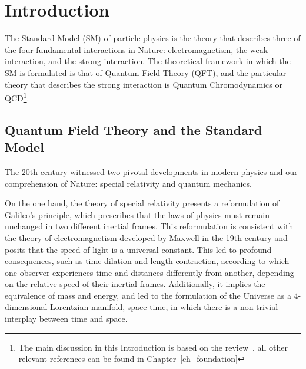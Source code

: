 \chapter*{Introduction}

\label{ch_introduction}



The Standard Model (SM) of particle physics is the theory that describes three of the four fundamental interactions in Nature: electromagnetism, the weak interaction, and the strong interaction. The theoretical framework in which the SM is formulated is that of Quantum Field Theory (QFT), and the particular theory that describes the strong interaction is Quantum Chromodynamics or QCD\footnote{The main discussion in this Introduction is based on the review~\citep{Wilczek:1998ma}, all other relevant references can be found in Chapter~\ref{ch_foundation}}.

\section*{Quantum Field Theory and the Standard Model}

The 20th century witnessed two pivotal developments in modern physics and our comprehension of Nature: special relativity and quantum mechanics. 

On the one hand, the theory of special relativity presents a reformulation of Galileo's principle, which prescribes that the laws of physics must remain unchanged in two different inertial frames. This reformulation is consistent with the theory of electromagnetism developed by Maxwell in the 19th century and posits that the speed of light is a universal constant. This led to profound consequences, such as time dilation and length contraction, according to which one observer experiences time and distances differently from another, depending on the relative speed of their inertial frames. Additionally, it implies the equivalence of mass and energy, and led to the formulation of the Universe as a 4-dimensional Lorentzian manifold, space-time, in which there is a non-trivial interplay between time and space.

